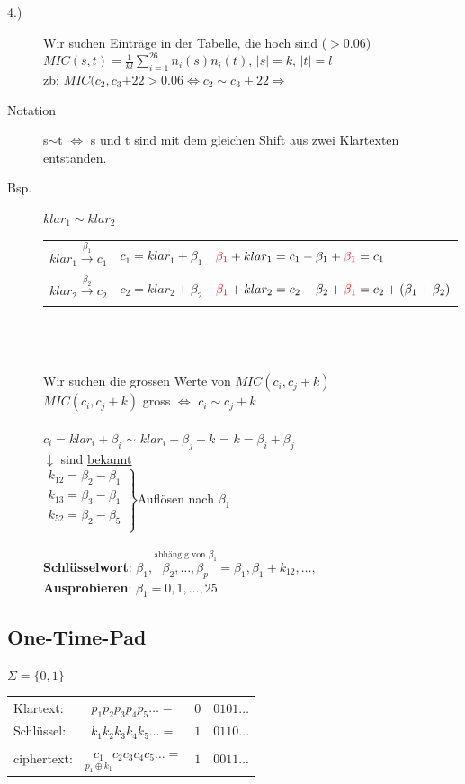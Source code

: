 \documentclass[10pt]{article}
\newcommand{\T}[1]{\text{#1}} %
\newcommand{\Ra}{\Rightarrow}
\newcommand{\Abs}[1]{\left| #1 \right|} %
\newcommand{\Brackar}[2]{\left.\begin{array}{#1} #2 \end{array}\right\rbrace} %
\newcommand{\Sum}[2]{\sum_{#2}^{#1}} %
\newcommand{\Oneover}[1]{\frac{1}{#1}} %
\newcommand{\Oben}[2]{\overset{#1}{#2}} %
\newcommand{\Unten}[2]{\underset{#1}{#2}} %
\begin{document}
\begin{description}
	\item[4.)] Wir suchen Einträge in der Tabelle, die hoch sind ($> 0.06$) \\
		$MIC(s,t)=\Oneover{kl}\Sum{26}{i=1}n_i(s)n_i(t)$, $\Abs{s}=k$, $\Abs{t}=l$\\
		zb: $MIC(c_2,c_3{+22} > 0.06 \Longleftrightarrow c_2 \sim c_3+22 \Ra$ \\
	\item[Notation] s$\sim$t $\Longleftrightarrow$ s und t sind mit dem gleichen Shift aus zwei Klartexten entstanden.
	\item[Bsp.] $klar_1 \sim klar_2$ \\
		\begin{tabular}{l | l | l}
			$klar_1 \xrightarrow[]{\beta_1} c_1$ & $c_1 = klar_1+\beta_1$ & ${\color{red}\beta_1}+klar_1=c_1-\beta_1+{\color{red}\beta_1}=c_1$ \\
			$klar_2 \xrightarrow[]{\beta_2} c_2$ & $c_2 = klar_2+\beta_2$ & ${\color{red}\beta_1}+klar_2=c_2-\beta_2+{\color{red}\beta_1}=c_2+(\beta_1+\beta_2)$\\
		\end{tabular} \\ \\ \\
		Wir suchen die grossen Werte von $MIC(c_i, c_j +k)$ \\
		$MIC(c_i, c_j +k)$ gross $\Longleftrightarrow$ $c_i \sim c_j + k$ \\ \\
		$c_i=klar_i+\beta_i$ $\sim$ $klar_i + \beta_j + k$ = {\color{red} $k = \beta_i + \beta_j$ }\\
		
		\hspace*{.2cm}$\downarrow$ sind \underline{bekannt}\\
		$\Brackar{c}{
		k_{12}=\beta_2-\beta_1\\
		k_{13}=\beta_3-\beta_1\\
		k_{52}=\beta_2-\beta_5\\
		}$Auflösen nach $\beta_1$\\\\
		\textbf{Schlüsselwort}: $\beta_1,\Oben{\T{abhängig von }\beta_1}{\beta_2,\dots,\beta_p}=\beta_1,\beta_1+k_{12},\dots,$ \\ 
		\textbf{Ausprobieren}: $\beta_1 = 0,1,\dots, 25$

\end{description}
\subsection{One-Time-Pad}
$\Sigma=\{0,1\}$
\begin{tabular}{lc|c|l}\cline{3-3}
Klartext:& $p_1p_2p_3p_4p_5\dots=$&$0$&$0101\dots$\\
Schlüssel:& $k_1k_2k_3k_4k_5\dots=$&$1$&$0110\dots$\\
ciphertext:& $\Unten{p_1\oplus k_1}{c_1}c_2c_3c_4c_5\dots=$&$1$&$0011\dots$\\\cline{3-3}
\end{tabular}
\end{document}
